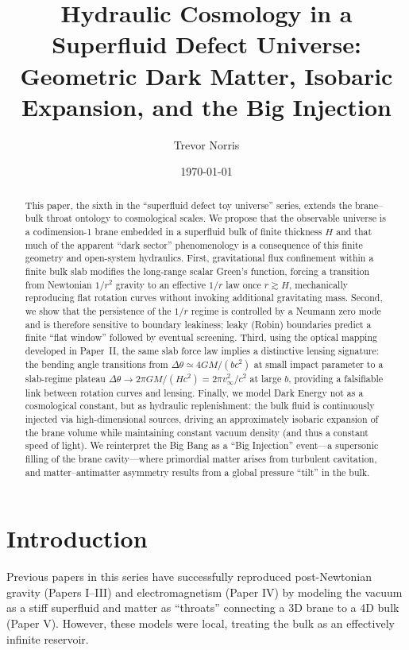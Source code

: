 \documentclass[12pt]{article}
\title{Hydraulic Cosmology in a Superfluid Defect Universe:\\
Geometric Dark Matter, Isobaric Expansion, and the Big Injection}
\author{Trevor Norris}
\date{\today}
\begin{document}
\maketitle

\begin{abstract}
This paper, the sixth in the ``superfluid defect toy universe'' series, extends the brane--bulk throat ontology to cosmological scales. We propose that the observable universe is a codimension-1 brane embedded in a superfluid bulk of finite thickness $H$ and that much of the apparent ``dark sector'' phenomenology is a consequence of this finite geometry and open-system hydraulics.
First, gravitational flux confinement within a finite bulk slab modifies the long-range scalar Green's function, forcing a transition from Newtonian $1/r^2$ gravity to an effective $1/r$ law once $r\gtrsim H$, mechanically reproducing flat rotation curves without invoking additional gravitating mass.
Second, we show that the persistence of the $1/r$ regime is controlled by a Neumann zero mode and is therefore sensitive to boundary leakiness; leaky (Robin) boundaries predict a finite ``flat window'' followed by eventual screening.
Third, using the optical mapping developed in Paper~II, the same slab force law implies a distinctive lensing signature: the bending angle transitions from $\Delta\theta\simeq 4GM/(b c^2)$ at small impact parameter to a slab-regime plateau $\Delta\theta\to 2\pi GM/(Hc^2)=2\pi v_\infty^2/c^2$ at large $b$, providing a falsifiable link between rotation curves and lensing.
Finally, we model Dark Energy not as a cosmological constant, but as hydraulic replenishment: the bulk fluid is continuously injected via high-dimensional sources, driving an approximately isobaric expansion of the brane volume while maintaining constant vacuum density (and thus a constant speed of light). We reinterpret the Big Bang as a ``Big Injection'' event---a supersonic filling of the brane cavity---where primordial matter arises from turbulent cavitation, and matter--antimatter asymmetry results from a global pressure ``tilt'' in the bulk.
\end{abstract}

\section{Introduction}
\label{sec:intro}

Previous papers in this series have successfully reproduced post-Newtonian gravity (Papers I--III) and electromagnetism (Paper IV) by modeling the vacuum as a stiff superfluid and matter as ``throats'' connecting a 3D brane to a 4D bulk (Paper V).
However, these models were local, treating the bulk as an effectively infinite reservoir.
\end{document}
